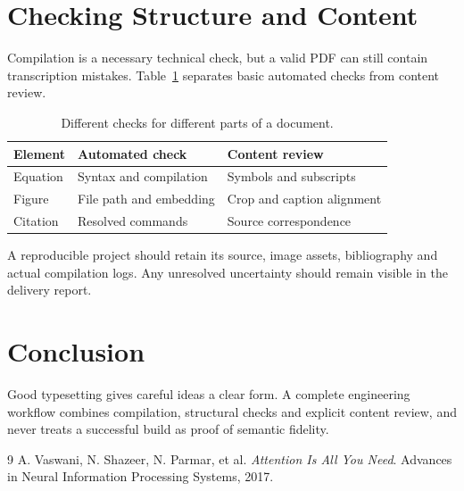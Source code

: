\documentclass[a4paper,11pt]{article}
\begin{document}
\section{Checking Structure and Content}
Compilation is a necessary technical check, but a valid PDF can still contain transcription mistakes. Table~\ref{tab:checks} separates basic automated checks from content review.
\begin{table}[htbp]
\centering
\caption{Different checks for different parts of a document.}
\label{tab:checks}
\begin{tabular}{lll}
\toprule
Element & Automated check & Content review \\
\midrule
Equation & Syntax and compilation & Symbols and subscripts \\
Figure & File path and embedding & Crop and caption alignment \\
Citation & Resolved commands & Source correspondence \\
\bottomrule
\end{tabular}
\end{table}
A reproducible project should retain its source, image assets, bibliography and actual compilation logs. Any unresolved uncertainty should remain visible in the delivery report.
\section{Conclusion}
Good typesetting gives careful ideas a clear form. A complete engineering workflow combines compilation, structural checks and explicit content review, and never treats a successful build as proof of semantic fidelity.
\begin{thebibliography}{9}
A. Vaswani, N. Shazeer, N. Parmar, et al.
\textit{Attention Is All You Need}.
Advances in Neural Information Processing Systems, 2017.
\end{thebibliography}
\end{document}
